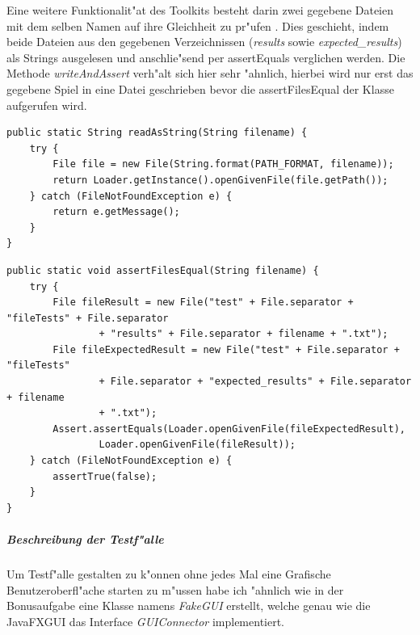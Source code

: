 Eine weitere Funktionalit"at des Toolkits besteht darin zwei gegebene Dateien mit dem selben Namen auf ihre Gleichheit zu pr"ufen . Dies geschieht, indem beide Dateien aus den gegebenen Verzeichnissen (\emph{results} sowie \emph{expected\_results}) als Strings ausgelesen und anschlie"send per assertEquals verglichen werden. Die Methode \emph{writeAndAssert} verh"alt sich hier sehr "ahnlich, hierbei wird nur erst das gegebene Spiel in eine Datei geschrieben bevor die assertFilesEqual der Klasse aufgerufen wird. 
\begin{lstlisting}[float,style=CodeHighlighting,caption=TestToolkit - readAsString,label=lst:testToolkit_readAsString]
public static String readAsString(String filename) {
    try {
        File file = new File(String.format(PATH_FORMAT, filename));
        return Loader.getInstance().openGivenFile(file.getPath());
    } catch (FileNotFoundException e) {
        return e.getMessage();
    }
}
\end{lstlisting}
\begin{lstlisting}[float,style=CodeHighlighting,caption=TestToolkit - assertFilesEqual,label=lst:testToolkit_assertFilesEqual]
public static void assertFilesEqual(String filename) {
    try {
        File fileResult = new File("test" + File.separator + "fileTests" + File.separator
                + "results" + File.separator + filename + ".txt");
        File fileExpectedResult = new File("test" + File.separator + "fileTests" 
        		+ File.separator + "expected_results" + File.separator + filename 
        		+ ".txt");
        Assert.assertEquals(Loader.openGivenFile(fileExpectedResult), 
        		Loader.openGivenFile(fileResult));
    } catch (FileNotFoundException e) {
        assertTrue(false);
    }
}
\end{lstlisting}

\subparagraph{Beschreibung der Testf"alle}
Um Testf"alle gestalten zu k"onnen ohne jedes Mal eine Grafische Benutzeroberfl"ache starten zu m"ussen habe ich "ahnlich wie in der Bonusaufgabe eine Klasse namens \emph{FakeGUI} erstellt, welche genau wie die JavaFXGUI das Interface \emph{GUIConnector} implementiert.


